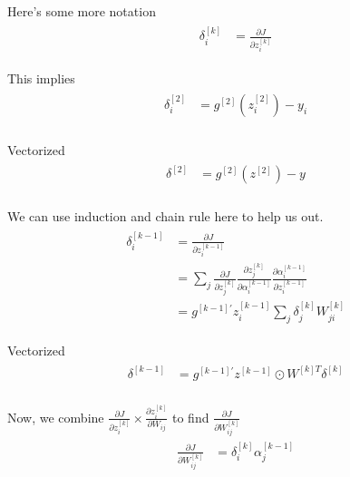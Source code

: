 \documentclass[paper=a4, fontsize=11pt]{scrartcl} %
\numberwithin{equation}{section} %
\numberwithin{figure}{section} %
\numberwithin{table}{section} %
\begin{document}
Here's some more notation
\begin{align} 
\begin{split}
\delta_i^{[k]}  	&= \frac{\partial J}{\partial z_i^{[k]}}
\end{split}					
\end{align}

This implies
\begin{align} 	
\begin{split}
\delta_i^{[2]}	&= g^{[2]}(z_i^{[2]}) - y_i\\
\end{split}		
\end{align}

Vectorized
\begin{align} 	
\begin{split}
\delta^{[2]}	&= g^{[2]}(z^{[2]}) - y\\
\end{split}		
\end{align}

We can use induction and chain rule here to help us out.
\begin{align} 
\begin{split}
\delta_i^{[k-1]}  	&= \frac{\partial J}{\partial z_i^{[k-1]}}\\
&= \sum_{j} \frac{\partial J}{\partial z_j^{[k]}} \frac{\partial z_j^{[k]}}{\partial \alpha_i^{[k - 1]}} \frac{\partial \alpha_i^{[k - 1]}}{\partial z_i^{[k-1]}}\\
&= g^{[k-1]'}z_i^{[k-1]}\sum_{j}\delta_j^{[k]}W^{[k]}_{ji}
\end{split}					
\end{align}

Vectorized
\begin{align} 	
\begin{split}
\delta^{[k-1]}	&= g^{[k-1]'}z^{[k-1]} \odot W^{[k]T} \delta^{[k]}\\
\end{split}		
\end{align}

Now, we combine $\frac{\partial J}{\partial z^{[k]}_i } \times \frac{\partial  z^{[k]}_i }{\partial  W_{ij} }$ to find $\frac{\partial J}{\partial W_{ij}^{[k]}}$
\begin{align} 	
\begin{split}
\frac{\partial J}{\partial W_{ij}^{[k]}}	&= \delta_i^{[k]}\alpha_j^{[k-1]}\\
\end{split}		
\end{align}
\end{document}
